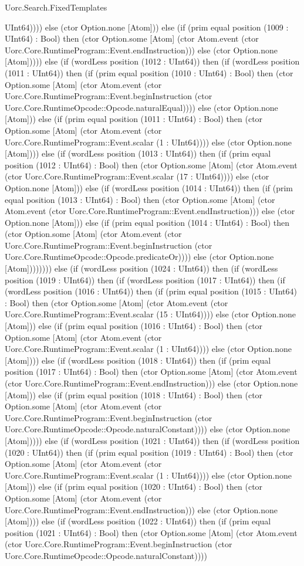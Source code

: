 \begin{lexlean}{Uorc.Search.FixedTemplates}
\begin{semanticmodule}
{UInt64)))) else (ctor Option.none [Atom])) else (if (prim equal position (1009 : UInt64) : Bool) then (ctor Option.some [Atom] (ctor Atom.event (ctor Uorc.Core.RuntimeProgram::Event.endInstruction))) else (ctor Option.none [Atom])))) else (if (wordLess position (1012 : UInt64)) then (if (wordLess position (1011 : UInt64)) then (if (prim equal position (1010 : UInt64) : Bool) then (ctor Option.some [Atom] (ctor Atom.event (ctor Uorc.Core.RuntimeProgram::Event.beginInstruction (ctor Uorc.Core.RuntimeOpcode::Opcode.naturalEqual)))) else (ctor Option.none [Atom])) else (if (prim equal position (1011 : UInt64) : Bool) then (ctor Option.some [Atom] (ctor Atom.event (ctor Uorc.Core.RuntimeProgram::Event.scalar (1 : UInt64)))) else (ctor Option.none [Atom]))) else (if (wordLess position (1013 : UInt64)) then (if (prim equal position (1012 : UInt64) : Bool) then (ctor Option.some [Atom] (ctor Atom.event (ctor Uorc.Core.RuntimeProgram::Event.scalar (17 : UInt64)))) else (ctor Option.none [Atom])) else (if (wordLess position (1014 : UInt64)) then (if (prim equal position (1013 : UInt64) : Bool) then (ctor Option.some [Atom] (ctor Atom.event (ctor Uorc.Core.RuntimeProgram::Event.endInstruction))) else (ctor Option.none [Atom])) else (if (prim equal position (1014 : UInt64) : Bool) then (ctor Option.some [Atom] (ctor Atom.event (ctor Uorc.Core.RuntimeProgram::Event.beginInstruction (ctor Uorc.Core.RuntimeOpcode::Opcode.predicateOr)))) else (ctor Option.none [Atom]))))))) else (if (wordLess position (1024 : UInt64)) then (if (wordLess position (1019 : UInt64)) then (if (wordLess position (1017 : UInt64)) then (if (wordLess position (1016 : UInt64)) then (if (prim equal position (1015 : UInt64) : Bool) then (ctor Option.some [Atom] (ctor Atom.event (ctor Uorc.Core.RuntimeProgram::Event.scalar (15 : UInt64)))) else (ctor Option.none [Atom])) else (if (prim equal position (1016 : UInt64) : Bool) then (ctor Option.some [Atom] (ctor Atom.event (ctor Uorc.Core.RuntimeProgram::Event.scalar (1 : UInt64)))) else (ctor Option.none [Atom]))) else (if (wordLess position (1018 : UInt64)) then (if (prim equal position (1017 : UInt64) : Bool) then (ctor Option.some [Atom] (ctor Atom.event (ctor Uorc.Core.RuntimeProgram::Event.endInstruction))) else (ctor Option.none [Atom])) else (if (prim equal position (1018 : UInt64) : Bool) then (ctor Option.some [Atom] (ctor Atom.event (ctor Uorc.Core.RuntimeProgram::Event.beginInstruction (ctor Uorc.Core.RuntimeOpcode::Opcode.naturalConstant)))) else (ctor Option.none [Atom])))) else (if (wordLess position (1021 : UInt64)) then (if (wordLess position (1020 : UInt64)) then (if (prim equal position (1019 : UInt64) : Bool) then (ctor Option.some [Atom] (ctor Atom.event (ctor Uorc.Core.RuntimeProgram::Event.scalar (1 : UInt64)))) else (ctor Option.none [Atom])) else (if (prim equal position (1020 : UInt64) : Bool) then (ctor Option.some [Atom] (ctor Atom.event (ctor Uorc.Core.RuntimeProgram::Event.endInstruction))) else (ctor Option.none [Atom]))) else (if (wordLess position (1022 : UInt64)) then (if (prim equal position (1021 : UInt64) : Bool) then (ctor Option.some [Atom] (ctor Atom.event (ctor Uorc.Core.RuntimeProgram::Event.beginInstruction (ctor Uorc.Core.RuntimeOpcode::Opcode.naturalConstant)))) }
\end{semanticmodule}
\end{lexlean}
